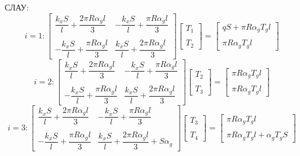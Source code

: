 \documentclass[a4paper, 12pt]{article}
\begin{document}
	СЛАУ:
	\[
	i=1: \begin{bmatrix}
		\dfrac{k_xS}{l}+\dfrac{2\pi R \alpha_g l}{3} & -\dfrac{k_xS}{l}+\dfrac{\pi R \alpha_g l}{3} \\ & \\
		-\dfrac{k_xS}{l}+\dfrac{\pi R \alpha_g l}{3} & \dfrac{k_xS}{l}+\dfrac{2\pi R \alpha_g l}{3} 
	\end{bmatrix} \begin{bmatrix}
	T_1\\ \\T_2
	\end{bmatrix}=\begin{bmatrix}
	qS+\pi R \alpha_g T_g l \\ \\
	\pi R \alpha_g T_g l
	\end{bmatrix}
	\]
	\[
	i=2: \begin{bmatrix}
		\dfrac{k_xS}{l}+\dfrac{2\pi R \alpha_g l}{3} & -\dfrac{k_xS}{l}+\dfrac{\pi R \alpha_g l}{3} \\ & \\
		-\dfrac{k_xS}{l}+\dfrac{\pi R \alpha_g l}{3} & \dfrac{k_xS}{l}+\dfrac{2\pi R \alpha_g l}{3} 
	\end{bmatrix} \begin{bmatrix}
		T_2\\ \\T_3
	\end{bmatrix}=\begin{bmatrix}
		\pi R \alpha_g T_g l \\ \\
		\pi R \alpha_g T_g l
	\end{bmatrix}
	\]
	\[
	i=3: \begin{bmatrix}
		\dfrac{k_xS}{l}+\dfrac{2\pi R \alpha_g l}{3} & -\dfrac{k_xS}{l}+\dfrac{\pi R \alpha_g l}{3} \\ & \\
		-\dfrac{k_xS}{l}+\dfrac{\pi R \alpha_g l}{3} & \dfrac{k_xS}{l}+\dfrac{2\pi R \alpha_g l}{3} +S\alpha_g 
	\end{bmatrix} \begin{bmatrix}
		T_3\\ \\T_4
	\end{bmatrix}=\begin{bmatrix}
		\pi R \alpha_g T_g l \\ \\
		\pi R \alpha_g T_g l + \alpha_g T_g S
	\end{bmatrix}
	\]
	
\end{document}
